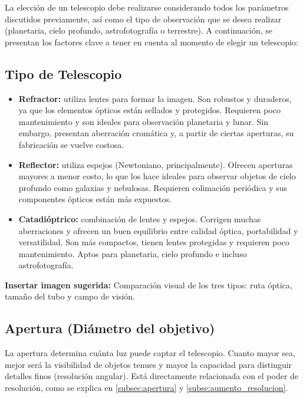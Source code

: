 La elección de un telescopio debe realizarse considerando todos los parámetros discutidos previamente, así como el tipo de observación que se desea realizar (planetaria, cielo profundo, astrofotografía o terrestre). A continuación, se presentan los factores clave a tener en cuenta al momento de elegir un telescopio:

\subsection*{Tipo de Telescopio}

\begin{itemize}
	\item \textbf{Refractor:} utiliza lentes para formar la imagen. Son robustos y duraderos, ya que los elementos ópticos están sellados y protegidos. Requieren poco mantenimiento y son ideales para observación planetaria y lunar. Sin embargo, presentan aberración cromática y, a partir de ciertas aperturas, su fabricación se vuelve costosa.
	
	\item \textbf{Reflector:} utiliza espejos (Newtoniano, principalmente). Ofrecen aperturas mayores a menor costo, lo que los hace ideales para observar objetos de cielo profundo como galaxias y nebulosas. Requieren colimación periódica y sus componentes ópticos están más expuestos.
	
	\item \textbf{Catadióptrico:} combinación de lentes y espejos. Corrigen muchas aberraciones y ofrecen un buen equilibrio entre calidad óptica, portabilidad y versatilidad. Son más compactos, tienen lentes protegidas y requieren poco mantenimiento. Aptos para planetaria, cielo profundo e incluso astrofotografía.
\end{itemize}

\vspace{0.2cm}
\textbf{Insertar imagen sugerida:} Comparación visual de los tres tipos: ruta óptica, tamaño del tubo y campo de visión.

\subsection*{Apertura (Diámetro del objetivo)}
\label{subsec:consideracion_apertura}

La apertura determina cuánta luz puede captar el telescopio. Cuanto mayor sea, mejor será la visibilidad de objetos tenues y mayor la capacidad para distinguir detalles finos (resolución angular). Está directamente relacionada con el poder de resolución, como se explica en \ref{subsec:apertura} y \ref{subse:aumento_resolucion}.

